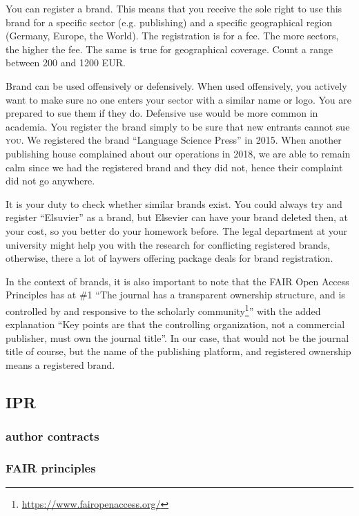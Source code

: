\documentclass[guidelines,nonflat,modfonts] {langsci/langscibook}
\newcommand{\footurl}[1]{\footnote{\url{#1}}}
\begin{document}
You can register a brand. This means that you receive the sole right to use this brand for a specific sector (e.g. publishing) and a specific geographical region (Germany, Europe, the World). The registration is for a fee. The more sectors, the higher the fee. The same is true for geographical coverage. Count a range between 200 and 1200 EUR. 

Brand can be used offensively or defensively. When used offensively, you actively want to make sure no one enters your sector with a similar name or logo. You are prepared to sue them if they do. Defensive use would be more common in academia. You register the brand simply to be sure that new entrants cannot sue \textsc{you}. We registered the brand ``Language Science Press'' in 2015. When another publishing house complained about our operations in 2018, we are able to remain calm since we had the registered brand and they did not, hence their complaint did not go anywhere.

It is your duty to check whether similar brands exist. You could always try and register ``Elsuvier'' as a brand, but Elsevier can have your brand deleted then, at your cost, so you better do your homework before. The legal department at your university might help you with the research for conflicting registered brands, otherwise, there a lot of laywers offering package deals for brand registration. 

In the context of brands, it is also important to note that the FAIR Open Access Principles has at \#1 ``The journal has a transparent ownership structure, and is controlled by and responsive to the scholarly community\footurl{https://www.fairopenaccess.org/}'' with the added explanation 
``Key points are that the controlling organization, not a commercial publisher, must own the journal title''. In our case, that would not be the journal title of course, but the name of the publishing platform, and registered ownership means a registered brand. 
 
\subsection{IPR}
\subsubsection{author contracts}
\subsubsection{FAIR principles}
\end{document}

